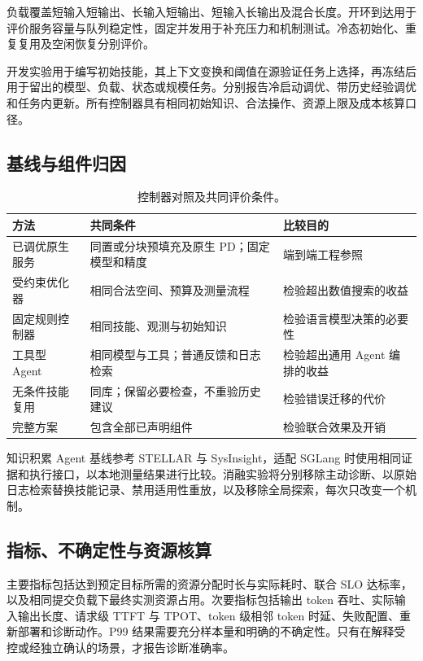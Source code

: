 \documentclass[preprint,12pt]{elsarticle}
\begin{document}
负载覆盖短输入短输出、长输入短输出、短输入长输出及混合长度。开环到达用于评价服务容量与队列稳定性，固定并发用于补充压力和机制测试。冷态初始化、重复复用及空闲恢复分别评价。

开发实验用于编写初始技能，其上下文变换和阈值在源验证任务上选择，再冻结后用于留出的模型、负载、状态或规模任务。分别报告冷启动调优、带历史经验调优和任务内更新。所有控制器具有相同初始知识、合法操作、资源上限及成本核算口径。

\subsection{基线与组件归因}
\begin{table}[H]
\centering\small
\begin{tabularx}{\linewidth}{@{}>{\raggedright\arraybackslash}p{30mm}YY@{}}
\toprule
方法 & 共同条件 & 比较目的 \\
\midrule
已调优原生服务 & 同置或分块预填充及原生 PD；固定模型和精度 & 端到端工程参照 \\
受约束优化器 & 相同合法空间、预算及测量流程 & 检验超出数值搜索的收益 \\
固定规则控制器 & 相同技能、观测与初始知识 & 检验语言模型决策的必要性 \\
工具型 Agent & 相同模型与工具；普通反馈和日志检索 & 检验超出通用 Agent 编排的收益 \\
无条件技能复用 & 同库；保留必要检查，不重验历史建议 & 检验错误迁移的代价 \\
完整方案 & 包含全部已声明组件 & 检验联合效果及开销 \\
\bottomrule
\end{tabularx}
\caption{控制器对照及共同评价条件。}
\end{table}

知识积累 Agent 基线参考 STELLAR 与 SysInsight，适配 SGLang 时使用相同证据和执行接口，以本地测量结果进行比较。消融实验将分别移除主动诊断、以原始日志检索替换技能记录、禁用适用性重放，以及移除全局探索，每次只改变一个机制。

\subsection{指标、不确定性与资源核算}
主要指标包括达到预定目标所需的资源分配时长与实际耗时、联合 SLO 达标率，以及相同提交负载下最终实测资源占用。次要指标包括输出 token 吞吐、实际输入输出长度、请求级 TTFT 与 TPOT、token 级相邻 token 时延、失败配置、重新部署和诊断动作。P99 结果需要充分样本量和明确的不确定性。只有在解释受控或经独立确认的场景，才报告诊断准确率。
\end{document}

